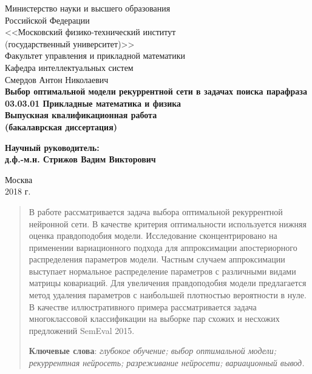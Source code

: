 \documentclass[12pt, fleqn, unicode]{article}
\begin{document}
{
\renewcommand{\baselinestretch}{1}
\thispagestyle{empty}
\begin{center}
    \sc
        Министерство науки и высшего образования \\Российской Федерации\\
        <<Московский физико-технический институт
        \\(государственный университет)>> \\
        Факультет управления и прикладной математики\\
        Кафедра интеллектуальных систем\\[35mm]
    \rm\large
        Смердов Антон Николаевич\\[10mm]
    \bf\Large
    Выбор оптимальной модели рекуррентной сети в
    задачах поиска парафраза\\[10mm]
    \rm\normalsize
        03.03.01 Прикладные математика и физика\\[10mm]
    \sc
        Выпускная квалификационная работа\\
        (бакалаврская диссертация)\\[30mm]
\end{center}
\hfill\parbox{80mm}{
    \begin{flushleft}
    \bf
        Научный руководитель:\\
    \rm
        д.ф.-м.н. Стрижов Вадим Викторович\\[4.9cm]
    \end{flushleft}
}
\begin{center}
    Москва\\
    2018 г.
\end{center}
}

\newpage
\tableofcontents

\newpage
\begin{abstract}
	
В работе рассматривается задача выбора оптимальной рекуррентной нейронной сети. В качестве критерия оптимальности используется нижняя оценка правдоподобия модели. Исследование сконцентрировано на применении вариационного подхода для аппроксимации апостериорного распределения параметров модели. Частным случаем аппроксимации выступает нормальное распределение параметров с различными видами матрицы ковариаций. Для увеличения правдоподобия модели предлагается метод удаления параметров с наибольшей плотностью вероятности в нуле. В качестве иллюстративного примера рассматривается задача многоклассовой классификации на выборке пар схожих и несхожих предложений SemEval 2015.

  \bigskip
    \textbf{Ключевые слова}: \emph{глубокое обучение; выбор оптимальной модели; рекуррентная нейросеть; разреживание нейросети; вариационный вывод.}
\end{abstract}
\end{document}
